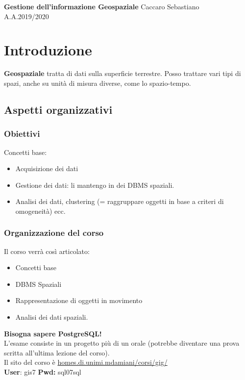 \documentclass[a4paper,12pt]{article}
\begin{document}
\begin{titlepage}
\begin{center}
	\Large{\textbf{Gestione dell'informazione Geospaziale}}
\vfill
\normalsize{Caccaro Sebastiano}\\
\normalsize{A.A.2019/2020}
\end{center}
\end{titlepage}
\tableofcontents

\clearpage


\section{Introduzione}
\textbf{Geospaziale} tratta di dati sulla superficie terrestre. Posso trattare vari tipi di spazi, anche su unità di misura diverse, come lo spazio-tempo.

\subsection{Aspetti organizzativi}
\subsubsection{Obiettivi}
Concetti base:
\begin{itemize}
	\item Acquisizione dei dati
	\item Gestione dei dati: li mantengo in dei DBMS spaziali.
	\item Analisi dei dati, clustering (= raggruppare oggetti in base a criteri di omogeneità) ecc.
\end{itemize}

\subsubsection{Organizzazione del corso}
Il corso verrà così articolato:
\begin{itemize}
	\item Concetti base
	\item DBMS Spaziali
	\item Rappresentazione di oggetti in movimento
	\item Analisi dei dati spaziali.	
\end{itemize}

\textbf{Bisogna sapere PostgreSQL!}\\
L'esame consiste in un progetto più di un orale (potrebbe diventare una prova scritta all'ultima lezione del corso).\\
Il sito del corso è \url{homes.di.unimi.mdamiani/corsi/gig/}\\
\textbf{User}: gis7 \textbf{Pwd:} sql07sql
\end{document}
